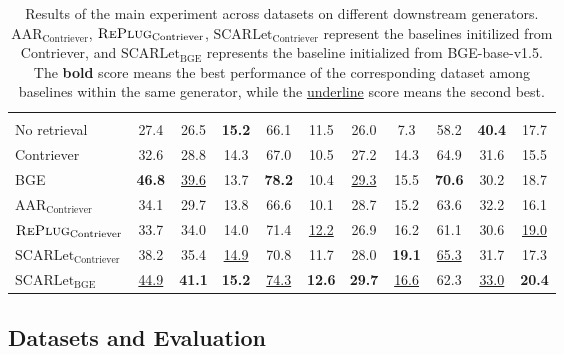 \documentclass[11pt]{article}
\begin{document}
\begin{table}[t!]
{\begin{tabular}{l|cccccc|cccc}
     \rowcolor{gray!30} \multicolumn{11}{c}{\textbf{Qwen2.5-3B-Instruct}} \\
     No retrieval & 27.4 & 26.5 & \textbf{15.2} & 66.1 & 11.5 & 26.0 & 7.3 & 58.2 & \textbf{40.4} & 17.7 \\
     \midrule
     Contriever & 32.6 & 28.8 & 14.3 & 67.0 & 10.5 & 27.2 & 14.3 & 64.9 & 31.6 & 15.5 \\
     BGE & \textbf{46.8} & \underline{39.6} & 13.7 & \textbf{78.2} & 10.4 & \underline{29.3} & 15.5 & \textbf{70.6} & 30.2 & 18.7 \\
     $\textrm{AAR}_{\textrm{Contriever}}$ & 34.1 & 29.7 & 13.8 & 66.6 & 10.1 & 28.7 & 15.2 & 63.6 & 32.2 & 16.1 \\
     $\textsc{RePlug}_{\textrm{Contriever}}$ & 33.7 & 34.0 & 14.0 & 71.4 & \underline{12.2} & 26.9 & 16.2 & 61.1 & 30.6 & \underline{19.0} \\
     \midrule
     \rowcolor{mypurple}
     $\textrm{SCARLet}_{\textrm{Contriever}}$ & 38.2 & 35.4 & \underline{14.9} & 70.8 & 11.7 & 28.0 & \textbf{19.1} & \underline{65.3} & 31.7 & 17.3 \\
     \rowcolor{mypurple}
     $\textrm{SCARLet}_{\textrm{BGE}}$ & \underline{44.9} & \textbf{41.1} & \textbf{15.2} & \underline{74.3} & \textbf{12.6} & \textbf{29.7} & \underline{16.6} & 62.3 & \underline{33.0} & \textbf{20.4} \\

     \bottomrule
\end{tabular}
}
    \caption{Results of the main experiment across datasets on different downstream generators. $\textrm{AAR}_{\textrm{Contriever}}$, $\textsc{RePlug}_{\textrm{Contriever}}$, $\textrm{SCARLet}_{\textrm{Contriever}}$ represent the baselines initilized from Contriever, and $\textrm{SCARLet}_{\textrm{BGE}}$ represents the baseline initialized from BGE-base-v1.5. The \textbf{bold} score means the best performance of the corresponding dataset among baselines within the same generator, while the \underline{underline} score means the second best.}
    \label{tab:tb-2}
\end{table}



\subsection{Datasets and Evaluation}
\label{sec:4-1}
\end{document}
